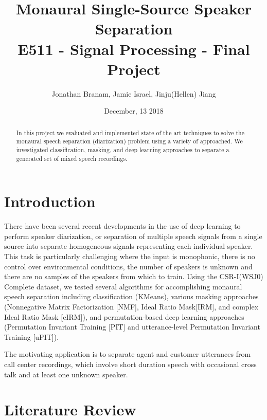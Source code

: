 \documentclass[journal, a4paper]{IEEEtran}
\begin{document}
	\title{Monaural Single-Source Speaker Separation \\
	{\large E511 - Signal Processing - Final Project}}
	\author{Jonathan Branam, Jamie Israel, Jinju(Hellen) Jiang}
	\date{December, 13 2018}
	\maketitle
%
\begin{abstract}
In this project we evaluated and implemented state of the art techniques to solve the monaural speech separation (diarization) problem using a variety of approached. We investigated classification, masking, and deep learning approaches to separate a generated set of mixed speech recordings.
\end{abstract}

\section{Introduction}
There have been several recent developments in the use of deep learning to perform speaker diarization, or separation of multiple speech signals from a single source into separate homogeneous signals representing each individual speaker. This task is particularly challenging where the input is monophonic, there is no control over environmental conditions, the number of speakers is unknown and there are no samples of the speakers from which to train. Using the CSR-I(WSJ0) Complete dataset\cite{garofolo:wsj0}, we tested several algorithms for accomplishing monaural speech separation including classification (KMeans), various masking approaches (Nonnegative Matrix Factorization [NMF], Ideal Ratio Mask[IRM], and complex Ideal Ratio Mask [cIRM]), and permutation-based deep learning approaches (Permutation Invariant Training [PIT] and utterance-level Permutation Invariant Training [uPIT]).

The motivating application is to separate agent and customer utterances from call center recordings, which involve short duration speech with occasional cross talk and at least one unknown speaker.

\section{Literature Review}
\end{document}
